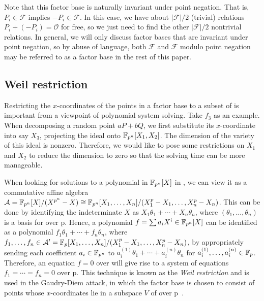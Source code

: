 Note that this factor base is naturally invariant under point
negation.
%
That is, $P_i\in\mathcal F$ implies $-P_i\in\mathcal F$.
%
In this case, we have about $|\mathcal F|/2$ (trivial) relations
$P_i+(-P_i)=\mathcal O$ for free, so we just need to find the other
$|\mathcal F|/2$ nontrivial relations.
%
In general, we will only discuss factor bases that are invariant under
point negation, so by abuse of language, both $\mathcal F$ and
$\mathcal F$ modulo point negation may be referred to as a factor base
in the rest of this paper.

\subsection{Weil restriction}
\label{sec:weil-restriction}
%
Restricting the $x$-coordinates of the points in a factor base to a
subset of  is important from a viewpoint of polynomial system
solving.
%
Take $f_3$ as an example.
%
When decomposing a random point $aP+bQ$, we first substitute its
$x$-coordinate into say $X_3$, projecting the ideal onto
$\mathbb F_{p^n}[X_1,X_2]$.
%
The dimension of the variety of this ideal is nonzero.
%
Therefore, we would like to pose some restrictions on $X_1$ and $X_2$
to reduce the dimension to zero so that the solving time can be more
manageable.

When looking for solutions to a polynomial in $\mathbb F_{p^n}[X]$ in ,
we can view it as a commutative affine algebra
$\mathcal A=\mathbb F_{p^n}[X]/(X^{p^n} -
X)\cong\mathbb F_{p^n}[X_1,\ldots,X_n]/(X_1^p - X_1,\ldots,X_n^p - X_n)$.
%
This can be done by identifying the indeterminate $X$ as
$X_1\theta_1+\cdots+X_n\theta_n$, where $(\theta_1,\ldots,\theta_n)$
is a basis for  over \F p.
%
Hence, a polynomial $f=\sum a_iX^i\in\mathbb F_{p^n}[X]$ can be identified as
a polynomial $f_1\theta_1+\cdots+f_n\theta_n$, where
$f_1,\ldots,f_n\in\mathcal A'=\mathbb F_{p}[X_1,\ldots,X_n]/(X_1^p -
X_1,\ldots,X_n^p - X_n)$, by appropriately sending each coefficient
$a_i\in\mathbb F_{p^n}$ to $a_i^{(1)}\theta_1+\cdots+a_i^{(n)}\theta_n$ for
$a_i^{(1)},\ldots,a_i^{(n)}\in\mathbb F_{p}$.
%
Therefore, an equation $f=0$ over  will give rise to a system
of equations $f_1=\cdots=f_n=0$ over \F p.
%
This technique is known as the \emph{Weil restriction} and is used in
the Gaudry-Diem attack, in which the factor base is chosen to consist
of points whose $x$-coordinates lie in a subspace $V$ of  over
\F p~\cite{DBLP:journals/jsc/Gaudry09,DBLP:journals/moc/Diem11}.

